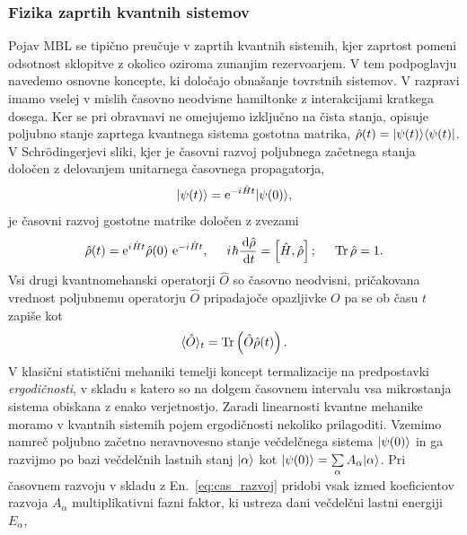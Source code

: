 \documentclass[10pt,a4paper]{article}
\newcommand{\iu}{{i\mkern1mu}}
\begin{document}
\subsubsection{Fizika zaprtih kvantnih sistemov}
Pojav MBL se tipično preučuje v zaprtih kvantnih sistemih, kjer zaprtost pomeni odsotnost sklopitve z okolico oziroma zunanjim rezervoarjem. V tem podpoglavju navedemo osnovne koncepte, ki določajo obnašanje tovrstnih sistemov. V razpravi imamo vselej v mislih časovno neodvisne hamiltonke z interakcijami kratkega dosega. 
Ker se pri obravnavi ne omejujemo izključno na čista stanja, opisuje poljubno stanje zaprtega kvantnega sistema gostotna matrika, $\hat{\rho}(t)=\vert\psi(t)\rangle\langle \psi(t) \vert$. V Schrödingerjevi sliki, kjer je časovni razvoj poljubnega začetnega stanja določen z delovanjem unitarnega časovnega propagatorja, 
\begin{equation}\label{eq:cas_razvoj}
\ket{\psi(t)}=\mathrm{e}^{-\iu \hat{H} t}\ket{\psi(0)},
\end{equation}
 je časovni razvoj gostotne matrike določen z zvezami 	
\begin{equation}
\hat{\rho}(t)=\mathrm{e}^{\iu \hat{H} t}\hat{\rho}(0)\ \mathrm{e}^{-\iu \hat{H} t}, \hspace{5mm} \iu\hbar\frac{\dd \hat{\rho}}{\dd t}=\left[\hat{H}, \hat{\rho}\right]; \hspace{5mm} \Tr{\hat{\rho}}=1.
\end{equation}
Vsi drugi kvantnomehanski operatorji $\hat{O}$ so časovno neodvisni, pričakovana vrednost poljubnemu operatorju $\hat{O}$ pripadajoče opazljivke $O$ pa se ob času $t$ zapiše kot 
\begin{equation}
\langle \hat{O}\rangle_t = \mathop{\rm Tr}\left(\hat{O}\hat{\rho}(t)\right).
\end{equation}
V klasični statistični mehaniki temelji koncept termalizacije na predpostavki \emph{ergodičnosti}, v skladu s katero so na dolgem časovnem intervalu vsa mikrostanja sistema obiskana z enako verjetnostjo. Zaradi linearnosti kvantne mehanike moramo v kvantnih sistemih pojem ergodičnosti nekoliko prilagoditi. Vzemimo namreč poljubno začetno neravnovesno stanje večdelčnega sistema $\vert\psi(0)\rangle$ in ga razvijmo po bazi večdelčnih lastnih stanj $\vert\alpha\rangle$ kot $\vert\psi(0)\rangle=\sum\limits_\alpha A_\alpha \vert\alpha\rangle$. Pri časovnem razvoju v skladu z En.~\ref{eq:cas_razvoj} pridobi vsak izmed koeficientov razvoja $A_\alpha$ multiplikativni fazni faktor, ki ustreza dani večdelčni lastni energiji $E_\alpha$, 
\end{document}
